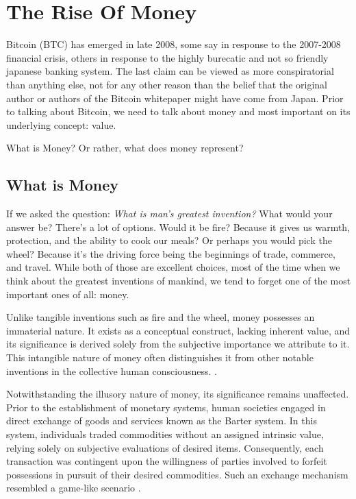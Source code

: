 \section{The Rise Of Money}
Bitcoin (BTC) has emerged in late 2008, some say in response to the 2007-2008 financial crisis, others in response to the highly burecatic and not so friendly
japanese banking system.
The last claim can be viewed as more conspiratorial than anything else, not for any other reason than the belief that the original author or authors
of the Bitcoin whitepaper \cite{nakamoto2008bitcoin} might have come from Japan.
Prior to talking about Bitcoin, we need to talk about money and most important on its underlying concept: value.

What is Money? Or rather, what does money represent?

\subsection{What is Money}
If we asked the question: \textit{What is man's greatest invention?} What would your answer be?
There's a lot of options. 
Would it be fire? Because it gives us warmth, protection, and the ability to cook our meals? Or perhaps you would pick the wheel? Because it's the driving
force being the beginnings of trade, commerce, and travel.
While both of those are excellent choices, most of the time when we think about the greatest inventions of mankind, we tend to forget one of the most
important ones of all: money.

Unlike tangible inventions such as fire and the wheel, money possesses an immaterial nature. It exists as a conceptual construct, lacking inherent value,
and its significance is derived solely from the subjective importance we attribute to it. This intangible nature of money often distinguishes it from other
notable inventions in the collective human consciousness. \cite{smith2010wealth}.

Notwithstanding the illusory nature of money, its significance remains unaffected. Prior to the establishment of monetary systems, human societies engaged
in direct exchange of goods and services known as the Barter system. In this system, individuals traded commodities without an assigned intrinsic value,
relying solely on subjective evaluations of desired items. Consequently, each transaction was contingent upon the willingness of parties involved to forfeit
possessions in pursuit of their desired commodities. Such an exchange mechanism resembled a game-like scenario \cite{durlauf2016new}.


